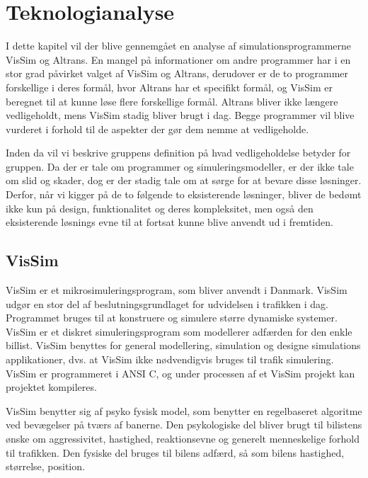 \chapter{Teknologianalyse}\label{Teknologianalyse}
I dette kapitel vil der blive gennemgået en analyse af simulationsprogrammerne VisSim og Altrans. En mangel på informationer om andre programmer har i en stor grad påvirket valget af VisSim og Altrans, derudover er de to programmer forskellige i deres formål, hvor Altrans har et specifikt formål, og VisSim er beregnet til at kunne løse flere forskellige formål. Altrans bliver ikke længere vedligeholdt, mens VisSim stadig bliver brugt i dag. Begge programmer vil blive vurderet i forhold til de aspekter der gør dem nemme at vedligeholde.

Inden da vil vi beskrive gruppens definition på hvad vedligeholdelse betyder for gruppen. Da der er tale om programmer og simuleringsmodeller, er der ikke tale om slid og skader, dog er der stadig tale om at sørge for at bevare disse løsninger. Derfor, når vi kigger på de to følgende to eksisterende løsninger, bliver de bedømt ikke kun på design, funktionalitet og deres kompleksitet, men også den eksisterende løsnings evne til at fortsat kunne blive anvendt ud i fremtiden.

\section{VisSim}
VisSim er et mikrosimuleringsprogram, som bliver anvendt i Danmark. VisSim udgør en stor del af beslutningsgrundlaget for udvidelsen i trafikken i dag. Programmet bruges til at konstruere og simulere større dynamiske systemer. VisSim er et diskret simuleringsprogram som modellerer adfærden for den enkle billist. VisSim benyttes for general modellering, simulation og designe simulations applikationer, dvs. at VisSim ikke nødvendigvis bruges til trafik simulering. VisSim er programmeret i ANSI C, og under processen af et VisSim projekt kan projektet kompileres.

\vspace{5mm}

VisSim benytter sig af psyko fysisk model, som benytter en regelbaseret algoritme ved bevægelser på tværs af banerne. Den psykologiske del bliver brugt til bilistens ønske om aggressivitet, hastighed, reaktionsevne og generelt menneskelige forhold til trafikken. Den fysiske del bruges til bilens adfærd, så som bilens hastighed, størrelse, position. \cite{TrafiksimuleringVisSim}

